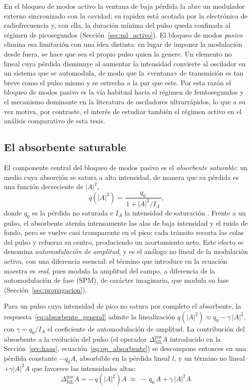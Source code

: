 En el bloqueo de modos activo la ventana de baja pérdida la abre un modulador
externo sincronizado con la cavidad; su rapidez está acotada por la electrónica de
radiofrecuencia y, con ella, la duración mínima del pulso queda confinada al
régimen de picosegundos (Sección~\ref{sec:ml_activo}). El bloqueo de modos
\emph{pasivo} elimina esa limitación con una idea distinta: en lugar de imponer la
modulación desde fuera, se hace que sea el propio pulso quien la genere. Un
elemento no lineal cuya pérdida disminuye al aumentar la intensidad convierte al
oscilador en un sistema que se automodula, de modo que la «ventana» de
transmisión es tan breve como el pulso mismo y se estrecha a la par que este. Por
esta razón el bloqueo de modos pasivo es la vía habitual hacia el régimen de
femtosegundos y el mecanismo dominante en la literatura de osciladores
ultrarrápidos, lo que a su vez motiva, por contraste, el interés de estudiar
también el régimen activo en el análisis comparativo de esta tesis.

\subsection{El absorbente saturable}
\label{sec:absorbente}

El componente central del bloqueo de modos pasivo es el \emph{absorbente
saturable}: un medio cuya absorción se satura a alta intensidad, de manera que su
pérdida es una función decreciente de $|A|^2$,
%
\begin{equation}
    q\!\left(|A|^2\right) = \frac{q_0}{\,1 + |A|^2/I_A\,},
    \label{eq:absorbente_general}
\end{equation}
%
donde $q_0$ es la pérdida no saturada e $I_A$ la intensidad de saturación
\cite[ecs.~7.20--7.22]{Keller2022}. Frente a
un pulso, el absorbente atenúa intensamente las alas de baja intensidad y el ruido
de fondo, pero se vuelve casi transparente en el pico: cada tránsito recorta las
colas del pulso y refuerza su centro, produciendo un acortamiento neto. Este efecto
se denomina \emph{automodulación de amplitud}, y es el análogo no lineal de la
modulación activa, con una diferencia esencial: el término que introduce en la
ecuación maestra es \emph{real}, pues modula la amplitud del campo, a diferencia
de la automodulación de fase (SPM), de carácter imaginario, que modula su fase
(Sección~\ref{sec:propagacion}).

Para un pulso cuya intensidad de pico no satura por completo el absorbente, la
respuesta~\eqref{eq:absorbente_general} admite la linealización
$q(|A|^2)\approx q_0-\gamma\,|A|^2$, con $\gamma = q_0/I_A$ el coeficiente de
automodulación de amplitud. La contribución del absorbente a la evolución del pulso
(el operador $\Delta_{\mathrm{ML}}^{\text{pas}}A$ introducido en la
Sección~\ref{sec:haus}, ecuación~\eqref{eq:op_absorbente}) se descompone entonces
en una pérdida constante $-q_0 A$, absorbible en la pérdida lineal $l$, y un
término no lineal $+\gamma|A|^2A$ que favorece las intensidades altas:
%
\begin{equation}
    \Delta_{\mathrm{ML}}^{\text{pas}} A
    = -\,q\!\left(|A|^2\right) A
    \;\approx\; -\,q_0\,A + \gamma\,|A|^2 A .
    \label{eq:op_absorbente_rapido}
\end{equation}

